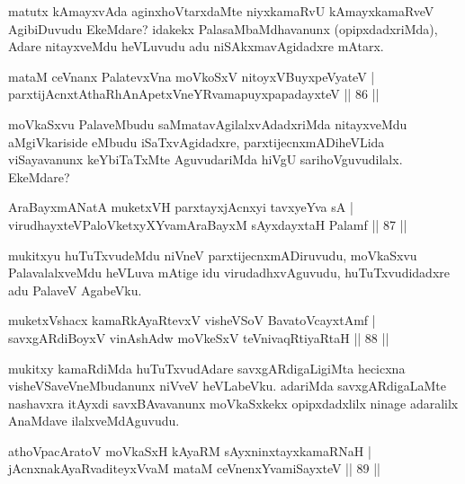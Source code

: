 \begin{artha}
matutx kAmayxvAda aginxhoVtarxdaMte niyxkamaRvU kAmayxkamaRveV AgibiDuvudu EkeMdare? idakekx PalasaMbaMdhavanunx (opipxdadxriMda), Adare nitayxveMdu heVLuvudu adu niSAkxmavAgidadxre mAtarx.
\end{artha}

\begin{shl}
mataM ceVnanx PalatevxVna moVkoSxV nitoyxV\s BuyxpeVyateV |\\
parxtijAcnxtAthaRhAnApetxVneYRvamapuyxpapadayxteV \hfill || 86 ||
\end{shl}

\begin{artha}
moVkaSxvu PalaveMbudu saMmatavAgilalxvAdadxriMda nitayxveMdu aMgiVkariside eMbudu iSaTxvAgidadxre, parxtijecnxmADiheVLida viSayavanunx keYbiTaTxMte AguvudariMda hiVgU sarihoVguvudilalx. EkeMdare?
\end{artha}

\begin{shl}
AraBayxmANatA muketxVH parxtayxjAcnxyi tavxyeYva sA |\\
virudhayxteV\s PaloVketxyXYvamAraBayxM sAyxdayxtaH Palamf \hfill || 87 ||
\end{shl}

\begin{artha}
mukitxyu huTuTxvudeMdu niVneV parxtijecnxmADiruvudu, moVkaSxvu PalavalalxveMdu heVLuva mAtige idu virudadhxvAguvudu, huTuTxvudidadxre adu PalaveV AgabeVku.
\end{artha}

\begin{shl}
muketxVshacx kamaRkAyaRtevxV visheVSoV BavatoVcayxtAmf |\\
savxgARdiBoyxV vinAshAdw moVkeSxV teV\s nivaqRtiyaRtaH \hfill || 88 ||
\end{shl}

\begin{artha}
mukitxy kamaRdiMda huTuTxvudAdare savxgARdigaLigiMta hecicxna visheVSaveVneMbudanunx niVveV heVLabeVku. adariMda savxgARdigaLaMte nashavxra itAyxdi savxBAvavanunx moVkaSxkekx opipxdadxlilx ninage adaralilx AnaMdave ilalxveMdAguvudu.
\end{artha}

\begin{shl}
athoVpacAratoV moVkaSxH kAyaRM sAyxninxtayxkamaRNaH |\\
jAcnxnakAyaRvaditeyxVvaM mataM ceVnenxYvamiSayxteV \hfill || 89 ||
\end{shl}


